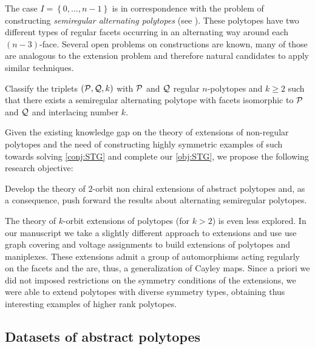 \documentclass[a4paper,12pt,english]{article}
\begin{document}
The case $I=\left\{ 0, \dots, n-1 \right\} $ is in correspondence with the problem of constructing \emph{semiregular alternating polytopes} (see \cite{MonsoSchul2022_InterlacingNumberAlternating,MonsoSchul2020_UniversalAlternatingSemiregular,MonsoSchul2019_AssemblyProblemAlternating,MonsoSchul2012_SemiregularPolytopesAmalgamated}).
These polytopes have two different types of regular facets occurring in an alternating way around each $(n-3)$-face. Several open problems on constructions are known, many of those  are analogous to the extension problem and therefore natural candidates to apply similar techniques.


\begin{problem}\label{prob:semiregular}
  Classify the triplets $(\mathcal{P}, \mathcal{Q}, k)$ with $\mathcal{P}$ and $\mathcal{Q}$ regular $n$-polytopes and $k \geq 2$ such that there exists a semiregular alternating polytope with facets isomorphic to $\mathcal{P}$ and $\mathcal{Q}$ and interlacing number $k$.
\end{problem}

Given the existing knowledge gap on the theory of extensions of non-regular polytopes and the need of constructing highly symmetric examples of such towards solving \cref{conj:STG} and complete our \cref{obj:STG}, we propose the following research objective:

\begin{obj}\label{obj:2_I}
  Develop the theory of $2$-orbit non chiral extensions of abstract polytopes and, as a consequence, push forward the results about alternating semiregular polytopes.
\end{obj}

The theory of $k$-orbit extensions of polytopes (for $k > 2$) is even less explored. 
In our manuscript \cite{CunnMocMon_CayleyExtensionsManiplexes_preprint} we take a slightly different approach to extensions and use use graph covering and voltage assignments to build extensions of polytopes and maniplexes. 
These extensions admit a group of automorphisms acting regularly on the facets and the are, thus, a generalization of Cayley maps. 
Since a priori we did not imposed restrictions on the symmetry conditions of the extensions, we were able to extend polytopes with diverse symmetry types, obtaining thus interesting examples of higher rank polytopes.

\subsection*{Datasets of abstract polytopes} \label{sec:datasets}
\end{document}
